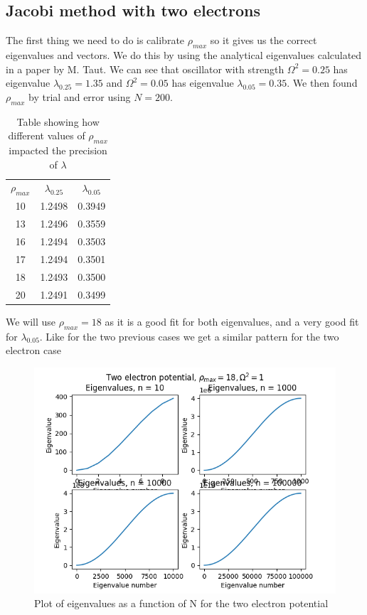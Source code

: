 \documentclass[american,a4paper,12pt]{article}
\begin{document}
\subsection*{Jacobi method with two electrons}
The first thing we need to do is calibrate $\rho_{max}$ so it gives us the correct eigenvalues and vectors. We do this by using the analytical eigenvalues calculated in a paper by M. Taut\cite{paper}. We can see that oscillator with strength $\Omega^2=0.25$ has eigenvalue $\lambda_{0.25} = 1.35$ and $\Omega^2=0.05$ has eigenvalue $\lambda_{0.05}=0.35$. We then found $\rho_{max}$ by trial and error using $N=200$.
\begin{table}[H]
    \centering
    \begin{tabular}{c|c|c}
         $\rho_{max}$ & $\lambda_{0.25}$ & $\lambda_{0.05}$ \\
         10 & 1.2498 & 0.3949 \\
         13 & 1.2496 & 0.3559 \\
         16 & 1.2494 & 0.3503 \\
         17 & 1.2494 & 0.3501 \\
         18 & 1.2493 & 0.3500 \\
         20 & 1.2491 & 0.3499 \\
    \end{tabular}
    \caption{Table showing how different values of $\rho_{max}$ impacted the precision of $\lambda$}
    \label{tab:rho2}
\end{table}
We will use $\rho_{max}=18$ as it is a good fit for both eigenvalues, and a very good fit for $\lambda_{0.05}$.
Like for the two previous cases we get a similar pattern for the two electron case
\begin{figure}[H]
    \centering
    \includegraphics[width = \textwidth]{figures/eigvals_2e_1w.png}
    \caption{Plot of eigenvalues as a function of N for the two electron potential}
    \label{fig:eigvals2}
\end{figure}
\end{document}
